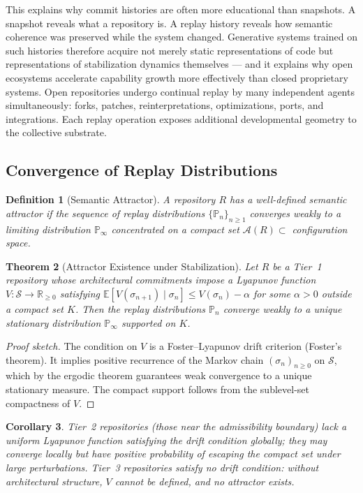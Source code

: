 \documentclass[11pt]{article}
\newtheorem{theorem}{Theorem}[section]
\newtheorem{corollary}[theorem]{Corollary}
\newtheorem{definition}[theorem]{Definition}
\begin{document}
This explains why commit histories are often more educational than snapshots.
A snapshot reveals what a repository is. A replay history reveals how semantic
coherence was preserved while the system changed. Generative systems trained on
such histories therefore acquire not merely static representations of code but
representations of stabilization dynamics themselves --- and it explains why
open ecosystems accelerate capability growth more effectively than closed
proprietary systems. Open repositories undergo continual replay by many
independent agents simultaneously: forks, patches, reinterpretations,
optimizations, ports, and integrations. Each replay operation exposes additional
developmental geometry to the collective substrate.

\subsection*{Convergence of Replay Distributions}

\begin{definition}[Semantic Attractor]
A repository $R$ has a well-defined semantic attractor if the sequence of
replay distributions $\{\mathbb{P}_n\}_{n \geq 1}$ converges weakly to a
limiting distribution $\mathbb{P}_\infty$ concentrated on a compact set
$\mathcal{A}(R) \subset$ configuration space.
\end{definition}

\begin{theorem}[Attractor Existence under Stabilization]
\label{thm:attractor-existence}
Let $R$ be a Tier~1 repository whose architectural commitments impose a
Lyapunov function $V : \mathcal{S} \to \mathbb{R}_{\geq 0}$ satisfying
$\mathbb{E}[V(\sigma_{n+1}) \mid \sigma_n] \leq V(\sigma_n) - \alpha$ for
some $\alpha > 0$ outside a compact set $K$. Then the replay distributions
$\mathbb{P}_n$ converge weakly to a unique stationary distribution
$\mathbb{P}_\infty$ supported on $K$.
\end{theorem}

\begin{proof}[Proof sketch]
The condition on $V$ is a Foster--Lyapunov drift criterion (Foster's theorem).
It implies positive recurrence of the Markov chain $(\sigma_n)_{n \geq 0}$
on $\mathcal{S}$, which by the ergodic theorem guarantees weak convergence to
a unique stationary measure. The compact support follows from the sublevel-set
compactness of $V$.
\end{proof}

\begin{corollary}
Tier~2 repositories (those near the admissibility boundary) lack a uniform
Lyapunov function satisfying the drift condition globally; they may converge
locally but have positive probability of escaping the compact set under large
perturbations. Tier~3 repositories satisfy no drift condition: without
architectural structure, $V$ cannot be defined, and no attractor exists.
\end{corollary}
\end{document}
